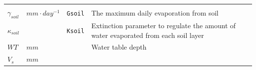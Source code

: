 \documentclass[]{book}
\begin{document}
\begin{longtable}[]{@{}llll@{}}
\begin{minipage}[t]{0.45\columnwidth}
\end{minipage}\tabularnewline
\begin{minipage}[t]{0.11\columnwidth}\raggedright\strut
\(\gamma_{soil}\)\strut
\end{minipage} & \begin{minipage}[t]{0.10\columnwidth}\raggedright\strut
\(mm \cdot day^{-1}\)\strut
\end{minipage} & \begin{minipage}[t]{0.12\columnwidth}\raggedright\strut
\texttt{Gsoil}\strut
\end{minipage} & \begin{minipage}[t]{0.45\columnwidth}\raggedright\strut
The maximum daily evaporation from soil\strut
\end{minipage}\tabularnewline
\begin{minipage}[t]{0.11\columnwidth}\raggedright\strut
\(\kappa_{soil}\)\strut
\end{minipage} & \begin{minipage}[t]{0.10\columnwidth}\raggedright\strut
\strut
\end{minipage} & \begin{minipage}[t]{0.12\columnwidth}\raggedright\strut
\texttt{Ksoil}\strut
\end{minipage} & \begin{minipage}[t]{0.45\columnwidth}\raggedright\strut
Extinction parameter to regulate the amount of water evaporated from
each soil layer\strut
\end{minipage}\tabularnewline
\begin{minipage}[t]{0.11\columnwidth}\raggedright\strut
\(WT\)\strut
\end{minipage} & \begin{minipage}[t]{0.10\columnwidth}\raggedright\strut
\(mm\)\strut
\end{minipage} & \begin{minipage}[t]{0.12\columnwidth}\raggedright\strut
\strut
\end{minipage} & \begin{minipage}[t]{0.45\columnwidth}\raggedright\strut
Water table depth\strut
\end{minipage}\tabularnewline
\begin{minipage}[t]{0.11\columnwidth}\raggedright\strut
\(V_{s}\)\strut
\end{minipage} & \begin{minipage}[t]{0.10\columnwidth}\raggedright\strut
\(mm\)\strut
\end{minipage} & \begin{minipage}[t]{0.12\columnwidth}\raggedright\strut

\end{minipage}
\end{longtable}
\end{document}
